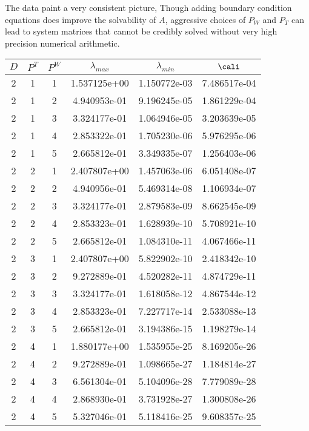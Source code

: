 \documentclass{article}
\begin{document}
{The data paint a very consistent picture,   Though adding boundary
condition equations does improve the solvability of $A$, aggressive
choices of $P_W$ and $P_T$ can lead to system matrices that cannot be
credibly solved without very high precision numerical arithmetic.
\begin{small}
\begin{table}
\begin{center}
\begin{tabular}{|ccc|ccc|} \hline
 $D$ & $P^T$  & $P^W$  & $\lambda_{max}$ & $\lambda_{min}$   & $\cali$ \\
 \hline
2 & 1 & 1 &  1.537125e+00 & 1.150772e-03 & 7.486517e-04 \\
2 & 1 & 2 &  4.940953e-01 & 9.196245e-05 & 1.861229e-04 \\
2 & 1 & 3 &  3.324177e-01 & 1.064946e-05 & 3.203639e-05 \\
2 & 1 & 4 &  2.853322e-01 & 1.705230e-06 & 5.976295e-06 \\
2 & 1 & 5 &  2.665812e-01 & 3.349335e-07 & 1.256403e-06 \\
2 & 2 & 1 &  2.407807e+00 & 1.457063e-06 & 6.051408e-07 \\
2 & 2 & 2 &  4.940956e-01 & 5.469314e-08 & 1.106934e-07 \\
2 & 2 & 3 &  3.324177e-01 & 2.879583e-09 & 8.662545e-09 \\
2 & 2 & 4 &  2.853323e-01 & 1.628939e-10 & 5.708921e-10 \\
2 & 2 & 5 &  2.665812e-01 & 1.084310e-11 & 4.067466e-11 \\
2 & 3 & 1 &  2.407807e+00 & 5.822902e-10 & 2.418342e-10 \\
2 & 3 & 2 &  9.272889e-01 & 4.520282e-11 & 4.874729e-11 \\ 
2 & 3 & 3 &  3.324177e-01 & 1.618058e-12 & 4.867544e-12 \\
2 & 3 & 4 &  2.853323e-01 & 7.227717e-14 & 2.533088e-13 \\
2 & 3 & 5 &  2.665812e-01 & 3.194386e-15 & 1.198279e-14 \\
2 & 4 & 1 &  1.880177e+00 & 1.535955e-25 & 8.169205e-26 \\
2 & 4 & 2 &  9.272889e-01 & 1.098665e-27 & 1.184814e-27 \\
2 & 4 & 3 &  6.561304e-01 & 5.104096e-28 & 7.779089e-28 \\
2 & 4 & 4 &  2.868930e-01 & 3.731928e-27 & 1.300808e-26 \\
2 & 4 & 5 &  5.327046e-01 & 5.118416e-25 & 9.608357e-25 \\

\end{tabular}
\end{center}
\end{table}
\end{small}}
\end{document}
